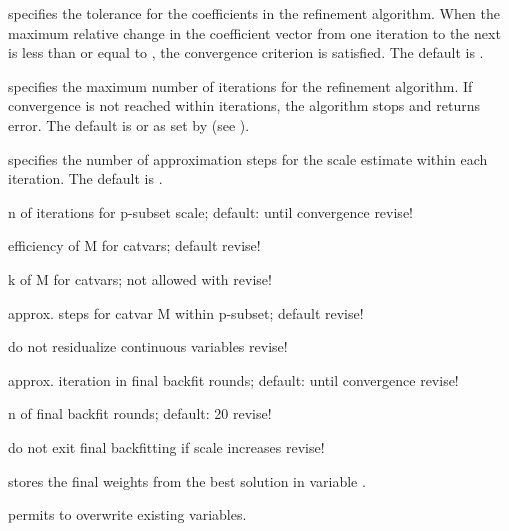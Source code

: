 \hangpara
     specifies the tolerance for the coefficients in the
    refinement  algorithm. When the maximum relative change in the
    coefficient vector from one iteration to the next is less than or equal to
    , the convergence criterion is satisfied. The default is
    .

\hangpara
     specifies the maximum number of iterations for the
    refinement  algorithm. If convergence is not reached within
     iterations, the algorithm stops and returns error. The
    default is  or as set by  (see
    ).

\hangpara
     specifies the number of approximation steps for the
    scale estimate within each  iteration. The default is
    .

\hangpara
     n of iterations for p-subset scale; default: until
    convergence \alert{revise!}

\hangpara
     efficiency of M for catvars; default
     \alert{revise!}

\hangpara
     k of M for catvars; not allowed with 
    \alert{revise!}

\hangpara
     approx. steps for catvar M within p-subset; default
     \alert{revise!}

\hangpara
     do not residualize continuous variables \alert{revise!}

\hangpara
     approx. iteration in final backfit rounds; default:
    until convergence \alert{revise!}

\hangpara
     n of final backfit rounds; default: 20
    \alert{revise!}

\hangpara
     do not exit final backfitting if scale increases
    \alert{revise!}

\hangpara
     stores the final  weights from
    the best solution in variable .

\hangpara
     permits  to overwrite existing variables.

